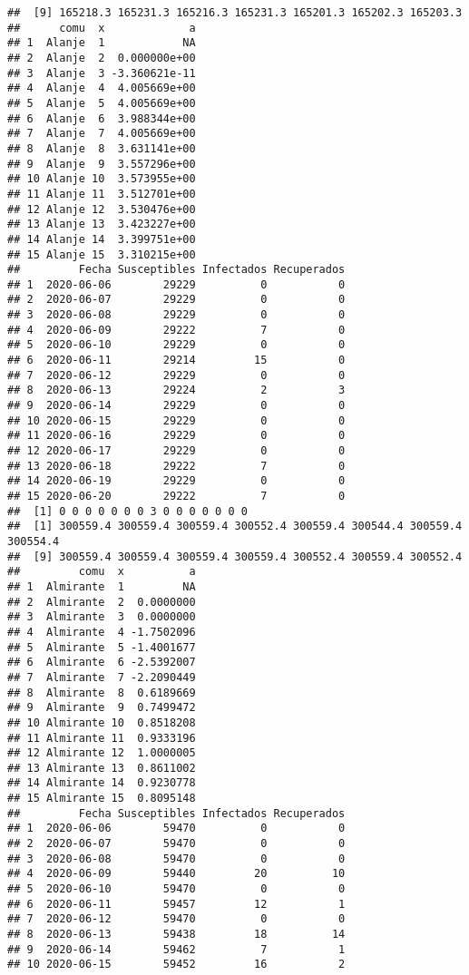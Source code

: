 \documentclass[
]{article}
\begin{document}
\begin{verbatim}
##  [9] 165218.3 165231.3 165216.3 165231.3 165201.3 165202.3 165203.3
##      comu  x             a
## 1  Alanje  1            NA
## 2  Alanje  2  0.000000e+00
## 3  Alanje  3 -3.360621e-11
## 4  Alanje  4  4.005669e+00
## 5  Alanje  5  4.005669e+00
## 6  Alanje  6  3.988344e+00
## 7  Alanje  7  4.005669e+00
## 8  Alanje  8  3.631141e+00
## 9  Alanje  9  3.557296e+00
## 10 Alanje 10  3.573955e+00
## 11 Alanje 11  3.512701e+00
## 12 Alanje 12  3.530476e+00
## 13 Alanje 13  3.423227e+00
## 14 Alanje 14  3.399751e+00
## 15 Alanje 15  3.310215e+00
##         Fecha Susceptibles Infectados Recuperados
## 1  2020-06-06        29229          0           0
## 2  2020-06-07        29229          0           0
## 3  2020-06-08        29229          0           0
## 4  2020-06-09        29222          7           0
## 5  2020-06-10        29229          0           0
## 6  2020-06-11        29214         15           0
## 7  2020-06-12        29229          0           0
## 8  2020-06-13        29224          2           3
## 9  2020-06-14        29229          0           0
## 10 2020-06-15        29229          0           0
## 11 2020-06-16        29229          0           0
## 12 2020-06-17        29229          0           0
## 13 2020-06-18        29222          7           0
## 14 2020-06-19        29229          0           0
## 15 2020-06-20        29222          7           0
##  [1] 0 0 0 0 0 0 0 3 0 0 0 0 0 0 0
##  [1] 300559.4 300559.4 300559.4 300552.4 300559.4 300544.4 300559.4 300554.4
##  [9] 300559.4 300559.4 300559.4 300559.4 300552.4 300559.4 300552.4
##         comu  x          a
## 1  Almirante  1         NA
## 2  Almirante  2  0.0000000
## 3  Almirante  3  0.0000000
## 4  Almirante  4 -1.7502096
## 5  Almirante  5 -1.4001677
## 6  Almirante  6 -2.5392007
## 7  Almirante  7 -2.2090449
## 8  Almirante  8  0.6189669
## 9  Almirante  9  0.7499472
## 10 Almirante 10  0.8518208
## 11 Almirante 11  0.9333196
## 12 Almirante 12  1.0000005
## 13 Almirante 13  0.8611002
## 14 Almirante 14  0.9230778
## 15 Almirante 15  0.8095148
##         Fecha Susceptibles Infectados Recuperados
## 1  2020-06-06        59470          0           0
## 2  2020-06-07        59470          0           0
## 3  2020-06-08        59470          0           0
## 4  2020-06-09        59440         20          10
## 5  2020-06-10        59470          0           0
## 6  2020-06-11        59457         12           1
## 7  2020-06-12        59470          0           0
## 8  2020-06-13        59438         18          14
## 9  2020-06-14        59462          7           1
## 10 2020-06-15        59452         16           2

\end{verbatim}
\end{document}

